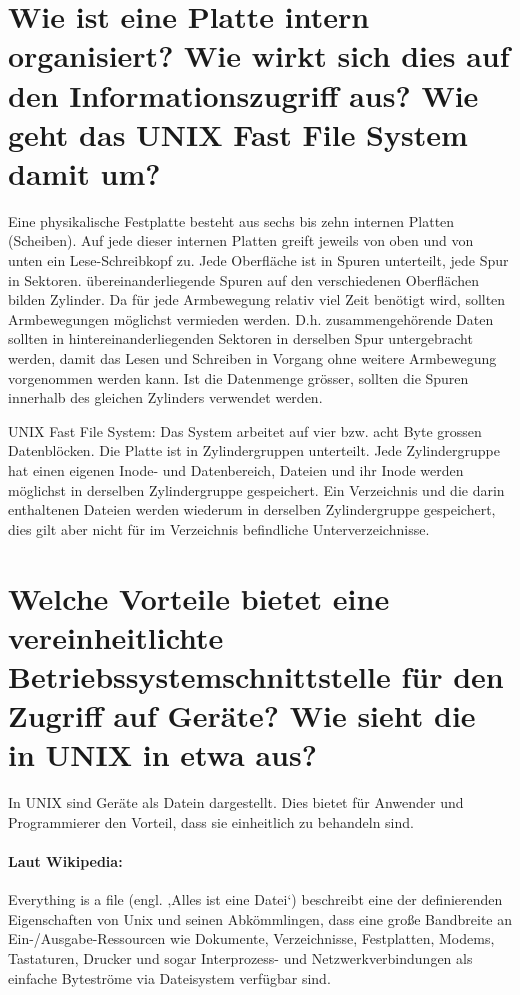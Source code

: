 \documentclass[12pt,a4paper,ngerman]{scrartcl}
\newcommand{\question}[1]{#1}
\newenvironment {answer}
                {}
                {}
\begin{document}
\section{\question{Wie ist eine Platte intern organisiert? Wie wirkt sich dies auf den Informationszugriff aus? Wie geht das UNIX Fast File System damit um?}}
\begin{answer}
Eine physikalische Festplatte besteht aus sechs bis zehn internen Platten (Scheiben). Auf jede
dieser internen Platten greift jeweils von oben und von unten ein Lese-Schreibkopf zu. Jede
Oberfläche ist in Spuren unterteilt, jede Spur in Sektoren. übereinanderliegende Spuren auf den
verschiedenen Oberflächen bilden Zylinder. Da für jede Armbewegung relativ viel Zeit benötigt
wird, sollten Armbewegungen möglichst vermieden werden. D.h. zusammengehörende Daten sollten
in hintereinanderliegenden Sektoren in derselben Spur untergebracht werden, damit das Lesen
und Schreiben in Vorgang ohne weitere Armbewegung vorgenommen werden kann. Ist die Datenmenge
grösser, sollten die Spuren innerhalb des gleichen Zylinders verwendet werden.

UNIX Fast File System:
Das System arbeitet auf vier bzw. acht Byte grossen Datenblöcken. Die Platte ist in Zylindergruppen unterteilt. Jede Zylindergruppe hat einen eigenen Inode- und Datenbereich, Dateien und ihr Inode werden möglichst in derselben Zylindergruppe gespeichert. Ein Verzeichnis und die darin enthaltenen Dateien werden wiederum in derselben Zylindergruppe gespeichert, dies gilt aber nicht für im Verzeichnis befindliche Unterverzeichnisse.
\end{answer}

\section{\question{Welche Vorteile bietet eine vereinheitlichte Betriebssystemschnittstelle für den  Zugriff auf Geräte? Wie sieht die in UNIX in etwa aus?}}
\begin{answer}
In UNIX sind Geräte als Datein dargestellt. Dies bietet für Anwender und Programmierer den
Vorteil, dass sie einheitlich zu behandeln sind.

\paragraph*{Laut Wikipedia:}
Everything is a file (engl. ‚Alles ist eine Datei‘) beschreibt eine der definierenden Eigenschaften von Unix und seinen Abkömmlingen, dass eine große Bandbreite an Ein-/Ausgabe-Ressourcen wie Dokumente, Verzeichnisse, Festplatten, Modems, Tastaturen, Drucker und sogar Interprozess- und Netzwerkverbindungen als einfache Byteströme via Dateisystem verfügbar sind.
\end{answer}
\end{document}
